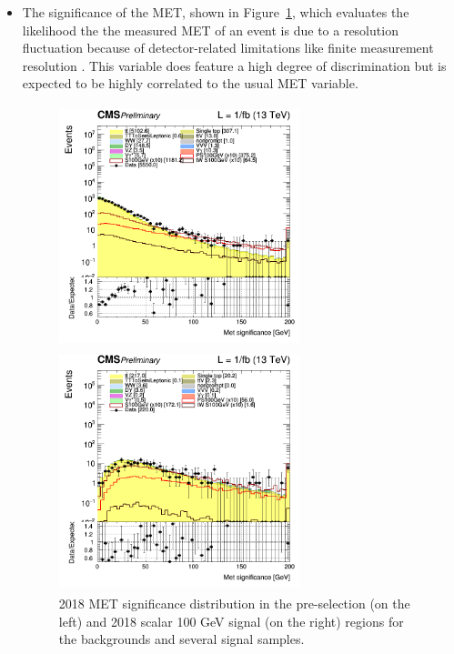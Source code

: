 \documentclass[a4paper, 10pt, openright]{report}
\begin{document}
\begin{itemize}
\item The significance of the \ac{MET}, shown in Figure~\ref{fig:SRdiscMETsign}, which evaluates the likelihood the the measured \ac{MET} of an event is due to a resolution fluctuation because of detector-related limitations like finite measurement resolution \cite{METsign}. This variable does feature a high degree of discrimination but is expected to be highly correlated to the usual \ac{MET} variable.

\begin{figure}[htbp]
\centering
\begin{minipage}[b]{.48\textwidth}
\includegraphics[width=7cm, height=7cm]{figs/log_cratio_topCR_ll_2j_signal1_MET_significance.png}
\end{minipage}\hfill
\begin{minipage}[b]{.48\textwidth}
\includegraphics[width=7cm, height=7cm]{figs/log_cratio_topCR_ll_2j_signal0_MET_significance.png}
\end{minipage} \hfill
\caption{2018 \ac{MET} significance distribution in the pre-selection (on the left) and 2018 scalar 100 GeV signal (on the right) regions for the backgrounds and several signal samples.}
\label{fig:SRdiscMETsign}
\end{figure}


\end{itemize}
\end{document}
